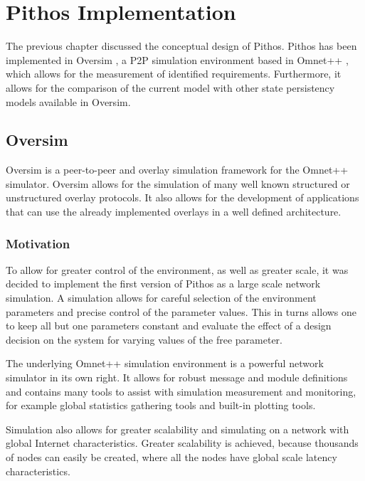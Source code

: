\chapter{Pithos Implementation}
\label{chp:IMPLEMENTATION}

The previous chapter discussed the conceptual design of Pithos. Pithos has been implemented in Oversim \cite{OverSim_2007}, a P2P simulation environment based in Omnet++ \cite{omnetpp}, which allows for the measurement of identified requirements. Furthermore, it allows for the comparison of the current model with other state persistency models available in Oversim.

\section{Oversim}

Oversim is a peer-to-peer and overlay simulation framework for the Omnet++ simulator. Oversim allows for the simulation of many well known structured or unstructured overlay protocols. It also allows for the development of applications that can use the already implemented overlays in a well defined architecture.

\subsection{Motivation}

To allow for greater control of the environment, as well as greater scale, it was decided to implement the first version of Pithos as a large scale network simulation. A simulation allows for careful selection of the environment parameters and precise control of the parameter values. This in turns allows one to keep all but one parameters constant and evaluate the effect of a design decision on the system for varying values of the free parameter.

The underlying Omnet++ simulation environment is a powerful network simulator in its own right. It allows for robust message and module definitions and contains many tools to assist with simulation measurement and monitoring, for example global statistics gathering tools and built-in plotting tools.

Simulation also allows for greater scalability and simulating on a network with global Internet characteristics. Greater scalability is achieved, because thousands of nodes can easily be created, where all the nodes have global scale latency characteristics.

